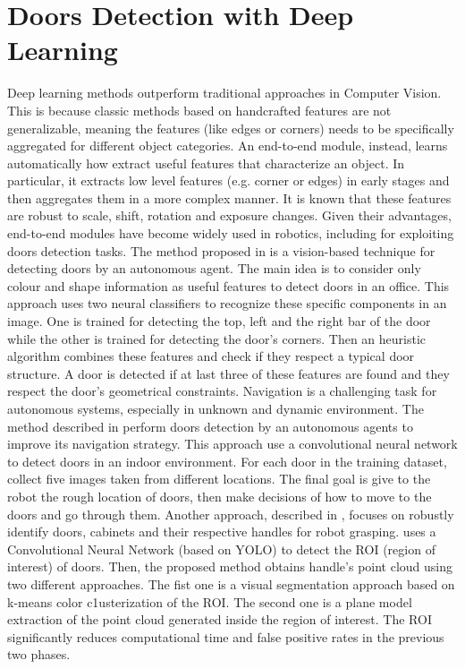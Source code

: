  \section{Doors Detection with Deep Learning} 
 Deep learning methods outperform traditional approaches in Computer Vision. This is because classic methods based on handcrafted features are not generalizable, meaning the features (like edges or corners) needs to be specifically aggregated for different object categories. An end-to-end module, instead, learns automatically how extract useful features that characterize an object. In particular, it extracts low level features (e.g. corner or edges) in early stages and then aggregates them in a more complex manner. It is known that these features are robust to scale, shift, rotation and exposure changes. Given their advantages, end-to-end modules have become widely used in robotics, including for exploiting doors detection tasks. The method proposed in \cite{detectdoorsfeature} is a vision-based technique for detecting doors by an autonomous agent. The main idea is to consider only colour and shape information as useful features to detect doors in an office. This approach uses two neural classifiers to recognize these specific components in an image. One is trained for detecting the top, left and the right bar of the door while the other is trained for detecting the door's corners. Then an heuristic algorithm combines these features and check if they respect a typical door structure. A door is detected if at last three of these features are found and they respect the door's geometrical constraints. Navigation is a challenging task for autonomous systems, especially in unknown and
 dynamic environment. The method described in \cite{doorsandnavigation} perform doors detection by an autonomous agents to improve its navigation strategy. This approach use a convolutional neural network to detect doors in an indoor environment. For each door in the training dataset, \citeauthor{doorsandnavigation} collect five images taken from different locations. The final goal is give to the robot the rough location of doors, then make decisions of how to move to the doors and go through them.
 Another approach, described in \cite{doorcabinet}, focuses on robustly identify doors, cabinets and their respective handles for robot grasping. \citeauthor{doorcabinet} uses a Convolutional Neural Network (based on YOLO) to detect the ROI (region of interest) of doors. Then, the proposed method obtains handle's point cloud using two different approaches. The fist one is a visual segmentation approach based on k-means color c1usterization of the ROI. The second one is a plane model extraction of the point cloud generated inside the region of interest. The ROI significantly reduces computational time and false positive rates in the previous two phases.
 
